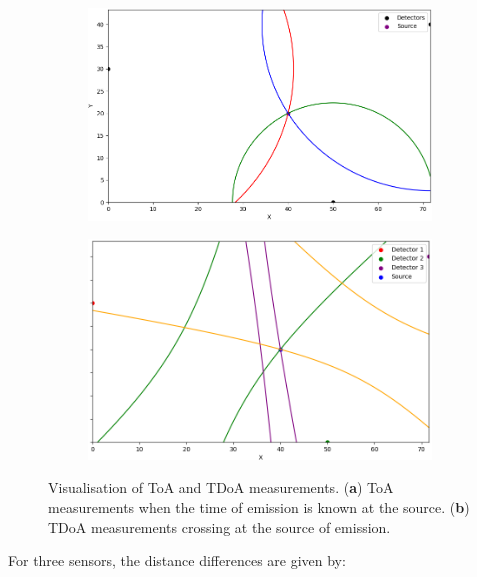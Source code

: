\begin{figure}[h!]
    \centering
    \begin{subfigure}[b]{.5\textwidth}
      \centering
      \includegraphics[width=\textwidth]{images/Figure_11.png}
      \caption{}
      \label{fig:ToA}
    \end{subfigure}%
    \begin{subfigure}[b]{.485\textwidth}
      \centering
      \includegraphics[width=\textwidth]{images/Figure_22.png}
      \caption{}
      \label{fig:TDoA}
    \end{subfigure}
    \caption{Visualisation of ToA and TDoA measurements. (\textbf{a}) ToA measurements when the time of emission is known at the source. (\textbf{b}) TDoA measurements crossing at the source of emission.}
    \label{fig:TDoA-ToA}
\end{figure}
\newpage

For three sensors, the distance differences are given by:

